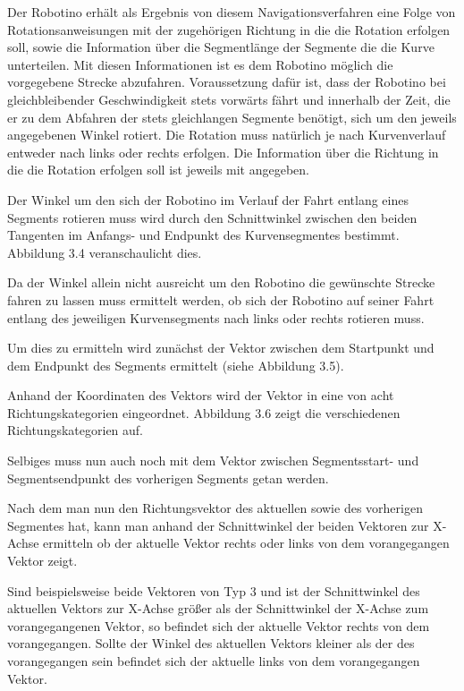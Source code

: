 
Der Robotino erhält als Ergebnis von diesem Navigationsverfahren eine Folge von
Rotationsanweisungen mit der zugehörigen Richtung in die die Rotation erfolgen
soll, sowie die Information über die Segmentlänge der Segmente die die Kurve
unterteilen. Mit diesen Informationen ist es dem Robotino möglich die
vorgegebene Strecke abzufahren. Voraussetzung dafür ist, dass der Robotino bei
gleichbleibender Geschwindigkeit stets vorwärts fährt und innerhalb der Zeit, die
er zu dem Abfahren der stets gleichlangen Segmente benötigt, sich um den jeweils
angegebenen Winkel rotiert. Die Rotation muss natürlich je nach Kurvenverlauf
entweder nach links oder rechts erfolgen. Die Information über die Richtung in
die die Rotation erfolgen soll ist jeweils mit angegeben.

Der Winkel um den sich der Robotino im Verlauf der Fahrt entlang eines Segments
rotieren muss wird durch den Schnittwinkel zwischen den beiden Tangenten im
Anfangs- und Endpunkt des Kurvensegmentes bestimmt. Abbildung 3.4
veranschaulicht dies.


Da der Winkel allein nicht ausreicht um den Robotino die gewünschte Strecke
fahren zu lassen muss ermittelt werden, ob sich der Robotino auf seiner Fahrt
entlang des jeweiligen Kurvensegments nach links oder rechts rotieren muss.

Um dies zu ermitteln wird zunächst der Vektor zwischen dem Startpunkt und dem
Endpunkt des Segments ermittelt (siehe Abbildung 3.5).


Anhand der Koordinaten des Vektors wird der Vektor in eine von acht
Richtungskategorien eingeordnet. Abbildung 3.6 zeigt die verschiedenen
Richtungskategorien auf.


Selbiges muss nun auch noch mit dem Vektor zwischen Segmentsstart- und
Segmentsendpunkt des vorherigen Segments getan werden.

Nach dem man nun den Richtungsvektor des aktuellen sowie des vorherigen
Segmentes hat, kann man anhand der Schnittwinkel der beiden Vektoren zur X-Achse
ermitteln ob der aktuelle Vektor rechts oder links von dem vorangegangen Vektor
zeigt.

Sind beispielsweise beide Vektoren von Typ 3 und ist der Schnittwinkel des
aktuellen Vektors zur X-Achse größer als der Schnittwinkel der X-Achse zum
vorangegangenen Vektor, so befindet sich der aktuelle Vektor rechts von dem
vorangegangen. Sollte der Winkel des aktuellen Vektors kleiner als der des
vorangegangen sein befindet sich der aktuelle links von dem vorangegangen
Vektor.

